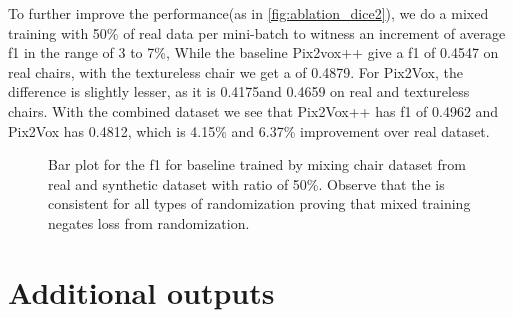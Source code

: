To further improve the performance(as in \autoref{fig:ablation_dice2}), we do a mixed training with 50\% of real data per mini-batch to witness an increment of average \gls{f1} in the range of 3 to 7\%,
While the baseline Pix2vox++ give a \gls{f1} of 0.4547 on real chairs, with the textureless chair we get a  of 0.4879.
For Pix2Vox, the difference is slightly lesser, as it is 0.4175and 0.4659 on real and textureless chairs.
With the combined dataset we see that Pix2Vox++ has \gls{f1} of 0.4962 and Pix2Vox has 0.4812, which is 4.15\% and 6.37\% improvement over real dataset.



\begin{figure}[ht]
    \centering
    \resizebox{0.7\textwidth}{!}{}
    \caption{Bar plot for the \gls{f1}  for baseline trained by mixing chair dataset from real and synthetic dataset with ratio of 50\%.
    Observe that the  is consistent for all types of randomization proving that mixed training negates loss from randomization.}
    \label{fig:ablation_dice2}
\end{figure}

\section{Additional outputs}\label{sec:additional-outputs}

